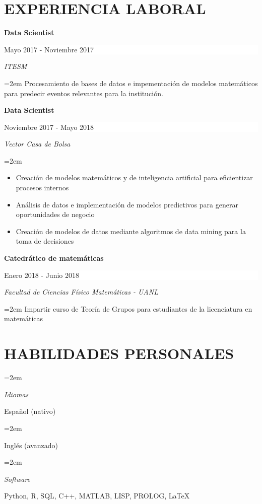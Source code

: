 \documentclass[paper=a4,fontsize=11pt]{scrartcl} %
\newlength{\spacebox}
\newcommand{\sepspace}{\vspace*{1em}}		%
\newcommand{\NewPart}[1]{\section*{\uppercase{#1}}}
\newcommand{\PersonalEntry}[2]{
		\noindent\hangindent=2em\hangafter=0 %
		\parbox{\spacebox}{        %
		\textit{#1}}		       %
		\hspace{1.5em} #2 \par}    %
\newcommand{\SkillsEntry}[2]{      %
		\noindent\hangindent=2em\hangafter=0 %
		\parbox{\spacebox}{        %
		\textit{#1}}			   %
		\hspace{1.5em} #2 \par}    %
\newcommand{\EducationEntry}[4]{
		\noindent \textbf{#1} \hfill      %
		\colorbox{White}{%
			\parbox{5cm}{%
			\hfill\color{Black}#2}} \par  %
		\noindent \textit{#3} \par        %
		\noindent\hangindent=2em\hangafter=0 \small #4 %
		\normalsize \par}
\begin{document}
\NewPart{Experiencia laboral}{}

\EducationEntry{Data Scientist}{Mayo 2017 - Noviembre 2017}{ITESM}{
Procesamiento de bases de datos e impementación de modelos matemáticos para predecir eventos relevantes para la institución.}
\sepspace

\EducationEntry{Data Scientist}{Noviembre 2017 - Mayo 2018}{Vector Casa de Bolsa}{\begin{itemize}
\item{Creación de modelos matemáticos y de inteligencia artificial para eficientizar procesos internos}
\item{Análisis de datos e implementación de modelos predictivos para generar oportunidades de negocio}
\item{Creación de modelos de datos mediante algoritmos de data mining para la toma de decisiones}
\end{itemize}}

\sepspace

\EducationEntry{Catedrático de matemáticas}{Enero 2018 - Junio 2018}{Facultad de Ciencias Físico Matemáticas - UANL}{Impartir curso de Teoría de Grupos  para estudiantes de la licenciatura en matemáticas}

\NewPart{Habilidades personales}{}

\SkillsEntry{Idiomas}{Español (nativo)}
\SkillsEntry{}{Inglés (avanzado)}

\SkillsEntry{Software}{Python, R, SQL, C++, MATLAB, LISP, PROLOG,  LaTeX}




\end{document}
